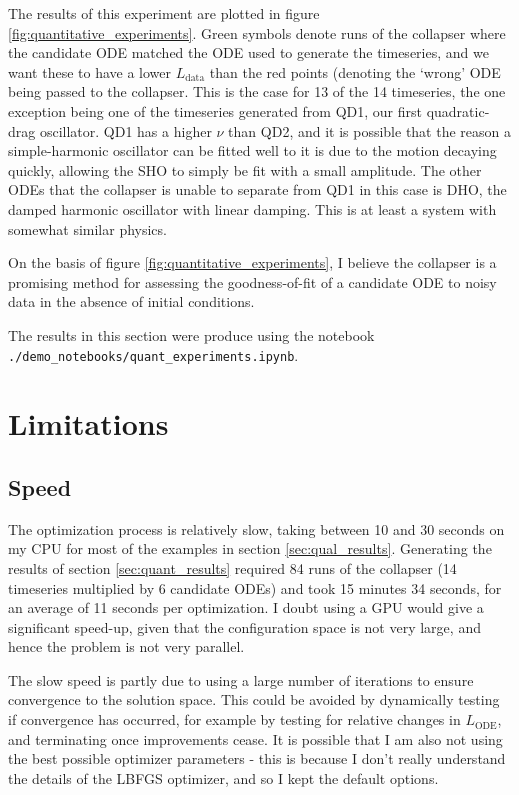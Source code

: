 \documentclass{article}
\begin{document}
The results of this experiment are plotted in figure \ref{fig:quantitative_experiments}.
Green symbols denote runs of the collapser where the candidate ODE matched the ODE used to generate the timeseries, and we want these to have a lower $L_{\mathrm{data}}$ than the red points (denoting the `wrong' ODE being passed to the collapser.
This is the case for 13 of the 14 timeseries, the one exception being one of the timeseries generated from QD1, our first quadratic-drag oscillator.
QD1 has a higher $\nu$ than QD2, and it is possible that the reason a simple-harmonic oscillator can be fitted well to it is due to the motion decaying quickly, allowing the SHO to simply be fit with a small amplitude.
The other ODEs that the collapser is unable to separate from QD1 in this case is DHO, the damped harmonic oscillator with linear damping.
This is at least a system with somewhat similar physics.

On the basis of figure \ref{fig:quantitative_experiments}, I believe the collapser is a promising method for assessing the goodness-of-fit of a candidate ODE to noisy data in the absence of initial conditions.

The results in this section were produce using the notebook \texttt{./demo\_notebooks/quant\_experiments.ipynb}.

\section{Limitations}

\subsection{Speed}

The optimization process is relatively slow, taking between 10 and 30 seconds on my CPU for most of the examples in section \ref{sec:qual_results}.
Generating the results of section \ref{sec:quant_results} required 84 runs of the collapser (14 timeseries multiplied by 6 candidate ODEs) and took 15 minutes 34 seconds, for an average of 11 seconds per optimization.
I doubt using a GPU would give a significant speed-up, given that the configuration space is not very large, and hence the problem is not very parallel.

The slow speed is partly due to using a large number of iterations to ensure convergence to the solution space.
This could be avoided by dynamically testing if convergence has occurred, for example by testing for relative changes in $L_{\mathrm{ODE}}$, and terminating once improvements cease.
It is possible that I am also not using the best possible optimizer parameters - this is because I don't really understand the details of the LBFGS optimizer, and so I kept the default options.
\end{document}
